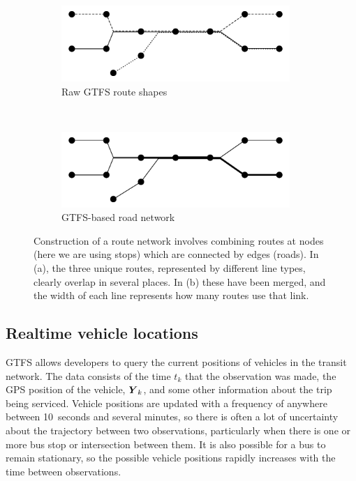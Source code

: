 \begin{figure}[tb]
    \centering
    \begin{subfigure}{0.7\textwidth}
        \centering
        \includegraphics[width=0.95\textwidth]{figures/02_network_segments_1.pdf}
        \caption{Raw GTFS route shapes}
        \label{fig:network_creation_1}
    \end{subfigure} \\
    \begin{subfigure}{0.7\textwidth}
        \centering
        \includegraphics[width=0.95\textwidth]{figures/02_network_segments_2.pdf}
        \caption{GTFS-based road network}
        \label{fig:network_creation_2}
    \end{subfigure}
    \caption{Construction of a route network involves combining routes at nodes %
        (here we are using stops) which are connected by edges (roads). %
        In (a), the three unique routes, represented by different line types, clearly %
        overlap in several places. In (b) these have been merged, and the width of each line %
        represents how many routes use that link.}
    \label{fig:network_creation}
\end{figure}


\subsection{Realtime vehicle locations}
\label{sec:realtime_data}

GTFS \rt allows developers to query the current positions of vehicles
in the transit network.
The data consists of the time $t_k$ that the observation was made,
the GPS position of the vehicle, $\mbox{$\boldsymbol{Y}$}_k$, 
and some other information about the trip being serviced.
Vehicle positions are updated with a frequency of anywhere between 10~seconds and several minutes,
so there is often a lot of uncertainty about the trajectory
between two observations, particularly when there is one or more bus stop
or intersection between them.
It is also possible for a bus to remain stationary,
so the possible vehicle positions rapidly increases with the time between observations.


